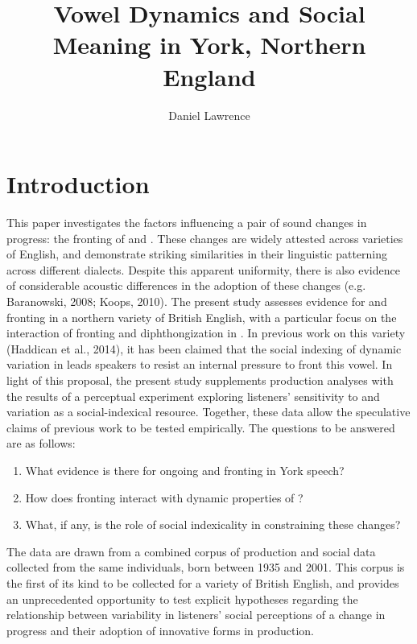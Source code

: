 \documentclass[PWPL]{article}
\title{Vowel Dynamics and Social Meaning in York, Northern England}
\author{Daniel Lawrence}
\begin{document}
\maketitle
\section{Introduction}
This paper investigates the factors influencing a pair of sound changes in progress: the fronting of  and . These changes are widely attested across varieties of English, and demonstrate striking similarities in their linguistic patterning across different dialects. Despite this apparent uniformity, there is also evidence of considerable acoustic differences in the adoption of these changes (e.g. Baranowski, 2008; Koops, 2010). The present study assesses evidence for  and  fronting in a northern variety of British English, with a particular focus on the interaction of fronting and diphthongization in . In previous work on this variety (Haddican et al., 2014), it has been claimed that the social indexing of dynamic variation in  leads speakers to resist an internal pressure to front this vowel. In light of this proposal, the present study supplements production analyses with the results of a perceptual experiment exploring listeners' sensitivity to  and  variation as a social-indexical resource. Together, these data allow the speculative claims of previous work to be tested empirically. The questions to be answered are as follows:

\begin{enumerate}
\item{What evidence is there for ongoing  and  fronting in York speech?}
\item{How does fronting interact with dynamic properties of ?}
\item{What, if any, is the role of social indexicality in constraining these changes?}
\end{enumerate}

The data are drawn from a combined corpus of production and social data collected from the same individuals, born between 1935 and 2001. This corpus is the first of its kind to be collected for a variety of British English, and provides an unprecedented opportunity to test explicit hypotheses regarding the relationship between variability in listeners' social perceptions of a change in progress and their adoption of innovative forms in production. 
\end{document}

